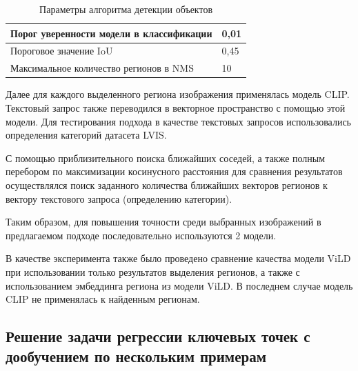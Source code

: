 \documentclass[a4paper,14pt]{article}
\begin{document}
    \begin{center}
        \begin{table}[H]
            \centering
            \caption{Параметры алгоритма детекции объектов}
            \label{tab:base_params}
            \bgroup
            \def\arraystretch{1.5}
            \begin{tabular}{| l | l |}
                \hline
                Порог уверенности модели в классификации & 0,01 \\ \hline
                Пороговое значение IoU                   & 0,45 \\ \hline
                Максимальное количество регионов в NMS   & 10   \\
                \hline
            \end{tabular}
            \egroup
        \end{table}
    \end{center}

    Далее для каждого выделенного региона изображения применялась модель CLIP.
    Текстовый запрос также переводился в векторное пространство с помощью этой модели.
    Для тестирования подхода в качестве текстовых запросов использовались определения категорий датасета LVIS.

    С помощью приблизительного поиска ближайших соседей, а также полным перебором по максимизации косинусного расстояния для сравнения результатов осуществлялся поиск заданного количества ближайших векторов регионов к вектору текстового запроса (определению категории).


    Таким образом, для повышения точности среди выбранных изображений в предлагаемом подходе последовательно используются 2 модели.

    В качестве эксперимента также было проведено сравнение качества модели ViLD при использовании только результатов выделения регионов, а также с использованием эмбеддинга региона из модели ViLD.
    В последнем случае модель CLIP не применялась к найденным регионам.

    \subsection{Решение задачи регрессии ключевых точек с дообучением по нескольким примерам}
\end{document}
